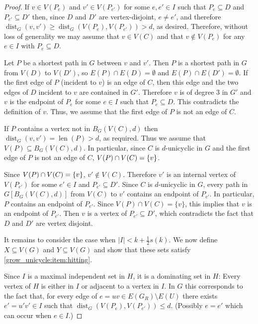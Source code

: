 \documentclass{patmorin}
\DeclareMathOperator{\len}{len}
\DeclareMathOperator{\dist}{dist}
\DeclarePairedDelimiter\set{\{}{\}}
\begin{document}
\begin{proof}
  
    If $v\in V(P_e)$ and $v'\in V(P_{e'})$ for some  $e,e' \in I$ such that $P_e\subseteq D$ and $P_{e'}\subseteq D'$ then, 
    since $D$ and $D'$ are vertex-disjoint, $e\neq e'$, and therefore 
    $\dist_G(v,v')\geq  \dist_G(V(P_e),V(P_{e'}))>d$, as desired.  Therefore, without loss of generality we may assume that $v\in V(C)$ and that $v\notin V(P_e)$ for any $e\in I$ with $P_e\subseteq D$.
    
    Let $P$ be a shortest path in $G$ between $v$ and $v'$.  Then $P$ is a shortest path in $G$ from $V(D)$ to $V(D')$, so $E(P)\cap E(D)=\emptyset$ and $E(P)\cap E(D')=\emptyset$.  If the first edge of $P$ (incident to $v$) is an edge of $C$, then this edge and the two edges of $D$ incident to $v$ are contained in $G'$. Therefore $v$ is of degree $3$ in $G'$ and $v$ is the endpoint of $P_e$ for some $e\in I$ such that $P_e\subseteq D$.  This contradicts the definition of $v$.
    Thus, we assume that the first edge of $P$ is not an edge of $C$. 
    
    If $P$ contains a vertex not in $B_G(V(C),d)$ then $\dist_G(v,v')=\len(P)>d$, as required.  Thus we assume that $V(P)\subseteq B_G(V(C),d)$.
    In particular, since $C$ is $d$-unicyclic in $G$ and the first edge of $P$ is not an edge of $C$, $V(P)\cap V(C)=\set{v}$. 
    
    Since $V(P)\cap V(C)=\set{v}$,  $v'\notin V(C)$.  Therefore $v'$ is an internal vertex of $V(P_{e'})$ for some $e'\in I$ and $P_{e'}\subseteq D'$.  Since $C$ is $d$-unicyclic in $G$, every path in $G[B_G(V(C),d)]$ from $V(C)$ to $v'$ contains an endpoint of $P_{e'}$.  In particular, $P$ contains an endpoint of $P_{e'}$.  Since $V(P)\cap V(C)=\{v\}$, this implies that $v$ is an endpoint of $P_{e'}$.  Then $v$ is a vertex of $P_{e'}\subseteq D'$, which contradicts the fact that $D$ and $D'$ are vertex disjoint.   
    
  It remains to consider the case when $|I| < k+\frac{1}{2}s(k)$.  We now define $X\subseteq V(G)$ and $Y\subseteq V(G)$ and show that these sets satisfy \cref{grow_unicycle:item:hitting}.  
  
  Since $I$ is a maximal independent set in $H$, it is a dominating set in $H$: Every vertex of $H$ is either in $I$ or adjacent to a vertex in $I$.  In $G$ this corresponds to the fact that, for every edge of $e=uv\in E(G_R)\setminus E(U)$ there exists $e'=u'v'\in I$ such that $\dist_G(V(P_{e}),V(P_{e'}))\le d$.  (Possibly $e=e'$ which can occur when $e\in I$.)


\end{proof}
\end{document}
